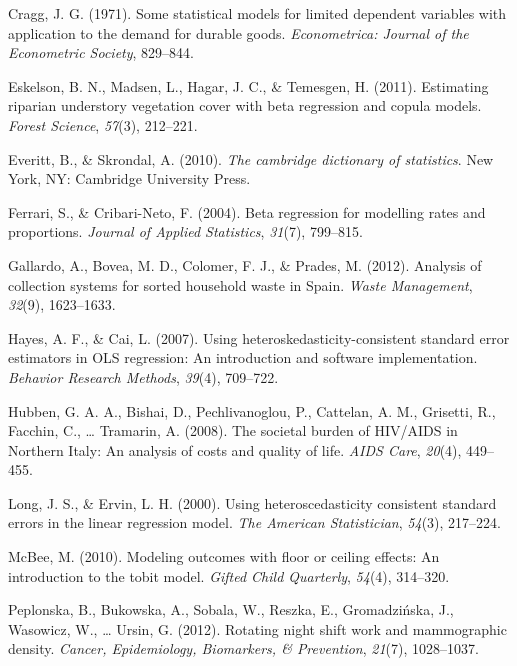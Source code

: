 \documentclass[english,man]{apa6}
\theoremstyle{definition}
\theoremstyle{definition}
\theoremstyle{remark}
\begin{document}
\hypertarget{ref-cragg1971some}{}
Cragg, J. G. (1971). Some statistical models for limited dependent
variables with application to the demand for durable goods.
\emph{Econometrica: Journal of the Econometric Society}, 829--844.

\hypertarget{ref-eskelson2011estimating}{}
Eskelson, B. N., Madsen, L., Hagar, J. C., \& Temesgen, H. (2011).
Estimating riparian understory vegetation cover with beta regression and
copula models. \emph{Forest Science}, \emph{57}(3), 212--221.

\hypertarget{ref-everitt2002cambridge}{}
Everitt, B., \& Skrondal, A. (2010). \emph{The cambridge dictionary of
statistics}. New York, NY: Cambridge University Press.

\hypertarget{ref-ferrari2004beta}{}
Ferrari, S., \& Cribari-Neto, F. (2004). Beta regression for modelling
rates and proportions. \emph{Journal of Applied Statistics},
\emph{31}(7), 799--815.

\hypertarget{ref-gallardo2012analysis}{}
Gallardo, A., Bovea, M. D., Colomer, F. J., \& Prades, M. (2012).
Analysis of collection systems for sorted household waste in Spain.
\emph{Waste Management}, \emph{32}(9), 1623--1633.

\hypertarget{ref-hayes2007using}{}
Hayes, A. F., \& Cai, L. (2007). Using heteroskedasticity-consistent
standard error estimators in OLS regression: An introduction and
software implementation. \emph{Behavior Research Methods}, \emph{39}(4),
709--722.

\hypertarget{ref-hubben2008societal}{}
Hubben, G. A. A., Bishai, D., Pechlivanoglou, P., Cattelan, A. M.,
Grisetti, R., Facchin, C., \ldots{} Tramarin, A. (2008). The societal
burden of HIV/AIDS in Northern Italy: An analysis of costs and quality
of life. \emph{AIDS Care}, \emph{20}(4), 449--455.

\hypertarget{ref-long2000using}{}
Long, J. S., \& Ervin, L. H. (2000). Using heteroscedasticity consistent
standard errors in the linear regression model. \emph{The American
Statistician}, \emph{54}(3), 217--224.

\hypertarget{ref-mcbee2010modeling}{}
McBee, M. (2010). Modeling outcomes with floor or ceiling effects: An
introduction to the tobit model. \emph{Gifted Child Quarterly},
\emph{54}(4), 314--320.

\hypertarget{ref-peplonska2012rotating}{}
Peplonska, B., Bukowska, A., Sobala, W., Reszka, E., Gromadzińska, J.,
Wasowicz, W., \ldots{} Ursin, G. (2012). Rotating night shift work and
mammographic density. \emph{Cancer, Epidemiology, Biomarkers, \&
Prevention}, \emph{21}(7), 1028--1037.
\end{document}
